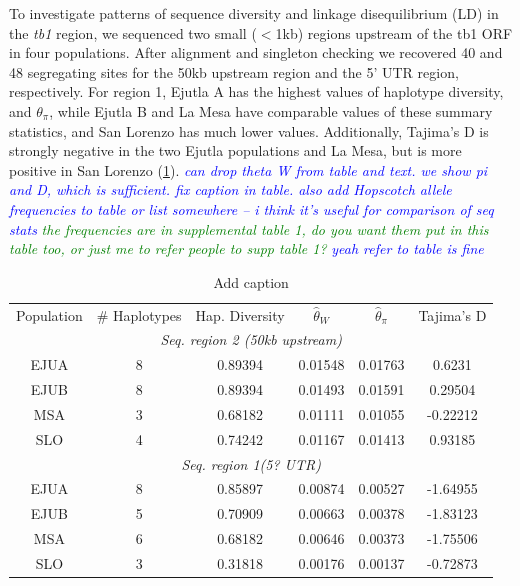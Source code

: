 \documentclass[12pt]{article}
\newcommand{\jri}[1]{\textcolor{blue}{ \emph{\scriptsize  #1}} }
\newcommand{\lev}[1]{\textcolor{green}{\emph{\scriptsize #1}} }
\begin{document}
To investigate patterns of sequence diversity and linkage disequilibrium (LD) in the \emph{tb1} region, we sequenced two small ($<$1kb) regions upstream of the tb1 ORF in four populations. After alignment and singleton checking we recovered 40 and 48 segregating sites for the 50kb upstream region and the 5' UTR region, respectively. For region 1, Ejutla A has the highest values of haplotype diversity, and $\theta_\pi$, while Ejutla B and La Mesa have comparable values of these summary statistics, and San Lorenzo has much lower values. Additionally, Tajima's D is strongly negative in the two Ejutla populations and La Mesa, but is more positive in San Lorenzo (\ref{Table2Diversity}). \jri{can drop theta W from table and text. we show pi and D, which is sufficient. fix caption in table. also add Hopscotch allele frequencies to table or list somewhere -- i think it's useful for comparison of seq stats } \lev{the frequencies are in supplemental table 1, do you want them put in this table too, or just me to refer people to supp table 1?} \jri{yeah refer to table is fine}
\begin{table}[htbp]
  \centering
  \caption{Add caption}
    \begin{tabular}{lccccc}
    Population & \# Haplotypes & Hap. Diversity & $\hat\theta_W$    & $\hat\theta_\pi$    & Tajima's D \\
    \multicolumn{6}{c}{\textit{Seq. region 2 (50kb upstream)}} \\
    \multicolumn{1}{c}{EJUA} & 8     & 0.89394 & 0.01548 & 0.01763 & 0.6231 \\
    \multicolumn{1}{c}{EJUB} & 8     & 0.89394 & 0.01493 & 0.01591 & 0.29504 \\
    \multicolumn{1}{c}{MSA} & 3     & 0.68182 & 0.01111 & 0.01055 & -0.22212 \\
    \multicolumn{1}{c}{SLO} & 4     & 0.74242 & 0.01167 & 0.01413 & 0.93185 \\
    \multicolumn{6}{c}{\textit{Seq.  region 1(5? UTR)}} \\
    \multicolumn{1}{c}{EJUA} & 8     & 0.85897 & 0.00874 & 0.00527 & -1.64955 \\
    \multicolumn{1}{c}{EJUB} & 5     & 0.70909 & 0.00663 & 0.00378 & -1.83123 \\
    \multicolumn{1}{c}{MSA} & 6     & 0.68182 & 0.00646 & 0.00373 & -1.75506 \\
    \multicolumn{1}{c}{SLO} & 3     & 0.31818 & 0.00176 & 0.00137 & -0.72873 \\
    \end{tabular}
  \label{Table2Diversity}
\end{table}
\end{document}
